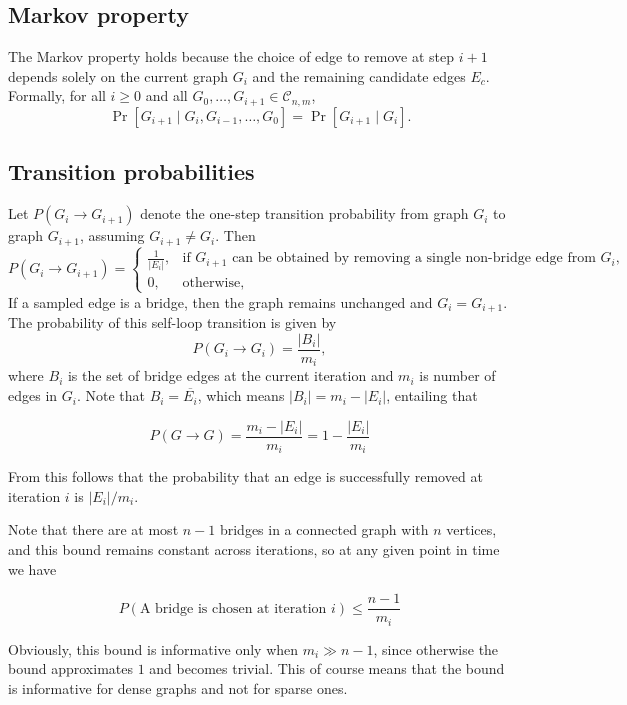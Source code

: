 \documentclass[11pt,a4paper]{article}
\begin{document}
\subsection*{Markov property}

The Markov property holds because the choice of edge to remove at step $i+1$ depends solely on the current graph $G_i$ and the remaining candidate edges $E_c$. Formally, for all $i\ge 0$ and all $G_0, \dots, G_{i+1} \in \mathcal{C}_{n,m}$,
\[
\Pr[G_{i+1} \mid G_i, G_{i-1}, \dots, G_0] = \Pr[G_{i+1} \mid G_i].
\]

\subsection*{Transition probabilities}

Let $P(G_i \to G_{i+1})$ denote the one-step transition probability from graph
$G_i$ to graph $G_{i+1}$, assuming $G_{i+1} \neq G_i$. Then
\[
P(G_i \to G_{i+1}) =
\begin{cases}
    \frac{1}{|E_i|}, & \text{if $G_{i+1}$ can be obtained by removing a single
    non-bridge edge from $G_i$,} \\
0, & \text{otherwise,}
\end{cases}
\]
If a sampled edge is a bridge, then the graph remains unchanged and $G_i =
G_{i+1}$. The probability of this self-loop transition is given by
\[
P(G_i \to G_i) = \frac{|B_i|}{m_i},
\]
where $B_i$ is the set of bridge edges at the current iteration and $m_i$ is
number of edges in $G_i$. Note that $B_i = \overline{E_i}$, which means 
$\left| B_i \right| = m_i - \left| E_i \right| $, entailing that

\begin{equation*}
P(G \to G) = \frac{m_i - \left| E_i \right| }{m_i} = 1 - \frac{\left| E_i
\right| }{m_i} 
\end{equation*}

From this follows that the probability that an edge is successfully removed at 
iteration $i$ is $\left| E_i \right| / m_i$. 

Note that there are at most $n-1$ bridges in a connected graph with $n$
vertices, and this bound remains constant across iterations, so at any given
point in time we have 

\begin{equation*}
     P(\text{A bridge is chosen at iteration } i) \leq \frac{n-1}{m_i}
\end{equation*} 

Obviously, this bound is informative only when $m_i \gg n - 1$, since otherwise
the bound approximates $1$ and becomes trivial. This of course means that the
bound is informative for dense graphs and not for sparse ones.
\end{document}
